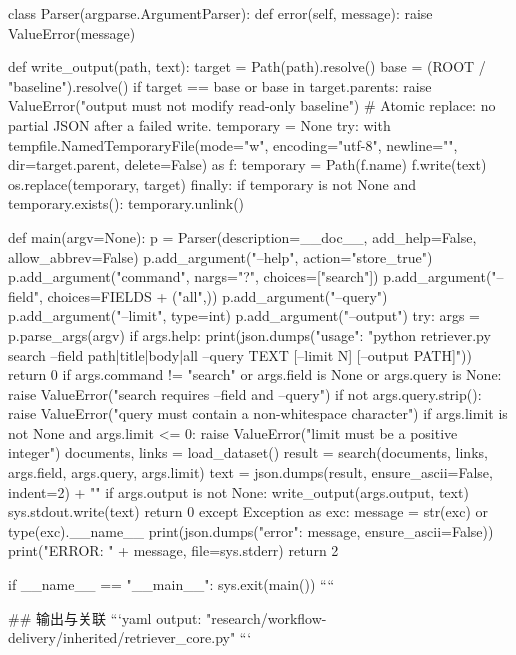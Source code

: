 class Parser(argparse.ArgumentParser):
    def error(self, message):
        raise ValueError(message)

def write_output(path, text):
    target = Path(path).resolve()
    base = (ROOT / "baseline").resolve()
    if target == base or base in target.parents:
        raise ValueError("output must not modify read-only baseline")
    # Atomic replace: no partial JSON after a failed write.
    temporary = None
    try:
        with tempfile.NamedTemporaryFile(mode="w", encoding="utf-8", newline="",
                                         dir=target.parent, delete=False) as f:
            temporary = Path(f.name)
            f.write(text)
        os.replace(temporary, target)
    finally:
        if temporary is not None and temporary.exists():
            temporary.unlink()

def main(argv=None):
    p = Parser(description=__doc__, add_help=False, allow_abbrev=False)
    p.add_argument("--help", action="store_true")
    p.add_argument("command", nargs="?", choices=["search"])
    p.add_argument("--field", choices=FIELDS + ("all",))
    p.add_argument("--query")
    p.add_argument("--limit", type=int)
    p.add_argument("--output")
    try:
        args = p.parse_args(argv)
        if args.help:
            print(json.dumps({"usage": "python retriever.py search --field path|title|body|all --query TEXT [--limit N] [--output PATH]"}))
            return 0
        if args.command != "search" or args.field is None or args.query is None:
            raise ValueError("search requires --field and --query")
        if not args.query.strip():
            raise ValueError("query must contain a non-whitespace character")
        if args.limit is not None and args.limit <= 0:
            raise ValueError("limit must be a positive integer")
        documents, links = load_dataset()
        result = search(documents, links, args.field, args.query, args.limit)
        text = json.dumps(result, ensure_ascii=False, indent=2) + "\n"
        if args.output is not None:
            write_output(args.output, text)
        sys.stdout.write(text)
        return 0
    except Exception as exc:
        message = str(exc) or type(exc).__name__
        print(json.dumps({"error": message}, ensure_ascii=False))
        print("ERROR: " + message, file=sys.stderr)
        return 2

if __name__ == "__main__":
    sys.exit(main())
````

## 输出与关联
```yaml
output: "research/workflow-delivery/inherited/retriever_core.py"
```
